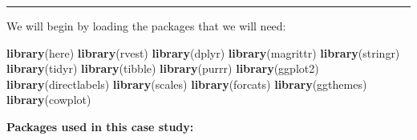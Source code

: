 \documentclass[
]{article}
\newenvironment{Shaded}{\begin{snugshade}}{\end{snugshade}}
\newcommand{\KeywordTok}[1]{\textcolor[rgb]{0.13,0.29,0.53}{\textbf{#1}}}
\newcommand{\NormalTok}[1]{#1}
\begin{document}
\begin{center}\rule{0.5\linewidth}{0.5pt}\end{center}

We will begin by loading the packages that we will need:

\begin{Shaded}
\begin{Highlighting}[]
\KeywordTok{library}\NormalTok{(here)}
\KeywordTok{library}\NormalTok{(rvest)}
\KeywordTok{library}\NormalTok{(dplyr)}
\KeywordTok{library}\NormalTok{(magrittr)}
\KeywordTok{library}\NormalTok{(stringr)}
\KeywordTok{library}\NormalTok{(tidyr)}
\KeywordTok{library}\NormalTok{(tibble)}
\KeywordTok{library}\NormalTok{(purrr)}
\KeywordTok{library}\NormalTok{(ggplot2)}
\KeywordTok{library}\NormalTok{(directlabels)}
\KeywordTok{library}\NormalTok{(scales)}
\KeywordTok{library}\NormalTok{(forcats)}
\KeywordTok{library}\NormalTok{(ggthemes)}
\KeywordTok{library}\NormalTok{(cowplot)}
\end{Highlighting}
\end{Shaded}

\textbf{Packages used in this case study:}
\end{document}
